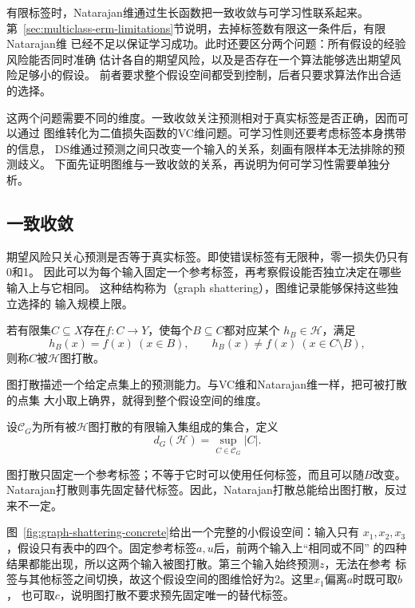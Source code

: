 有限标签时，Natarajan维通过生长函数把一致收敛与可学习性联系起来。
第~\ref{sec:multiclass-erm-limitations}节说明，去掉标签数有限这一条件后，有限Natarajan维
已经不足以保证学习成功。此时还要区分两个问题：所有假设的经验风险能否同时准确
估计各自的期望风险，以及是否存在一个算法能够选出期望风险足够小的假设。
前者要求整个假设空间都受到控制，后者只要求算法作出合适的选择。

这两个问题需要不同的维度。一致收敛关注预测相对于真实标签是否正确，因而可以通过
图维转化为二值损失函数的VC维问题。可学习性则还要考虑标签本身携带的信息，
DS维通过预测之间只改变一个输入的关系，刻画有限样本无法排除的预测歧义。
下面先证明图维与一致收敛的关系，再说明为何可学习性需要单独分析。

\subsection{一致收敛}

期望风险只关心预测是否等于真实标签。即使错误标签有无限种，零一损失仍只有0和1。
因此可以为每个输入固定一个参考标签，再考察假设能否独立决定在哪些输入上与它相同。
这种结构称为（graph shattering），图维记录能够保持这些独立选择的
输入规模上限。

\begin{definition}[图打散]
\label{def:graph-dimension}
若有限集$C\subseteq X$存在$f:C\to Y$，使每个$B\subseteq C$都对应某个
$h_B\in\mathcal H$，满足
\[
 h_B(x)=f(x)\ (x\in B),\qquad h_B(x)\neq f(x)\ (x\in C\setminus B),
\]
则称$C$被$\mathcal H$图打散。
\end{definition}

图打散描述一个给定点集上的预测能力。与VC维和Natarajan维一样，把可被打散的点集
大小取上确界，就得到整个假设空间的维度。

\begin{definition}[图维]
\label{def:graph-dimension-value}
设$\mathcal C_G$为所有被$\mathcal H$图打散的有限输入集组成的集合，定义
\[
 d_G(\mathcal H)=\sup_{C\in\mathcal C_G}|C|.
\]
\end{definition}

图打散只固定一个参考标签；不等于它时可以使用任何标签，而且可以随$B$改变。
Natarajan打散则事先固定替代标签。因此，Natarajan打散总能给出图打散，反过来不一定。

图~\ref{fig:graph-shattering-concrete}给出一个完整的小假设空间：输入只有
$x_1,x_2,x_3$，假设只有表中的四个。固定参考标签$a,u$后，前两个输入上“相同或不同”
的四种结果都能出现，所以这两个输入被图打散。第三个输入始终预测$z$，无法在参考
标签与其他标签之间切换，故这个假设空间的图维恰好为2。这里$x_1$偏离$a$时既可取$b$，
也可取$c$，说明图打散不要求预先固定唯一的替代标签。

